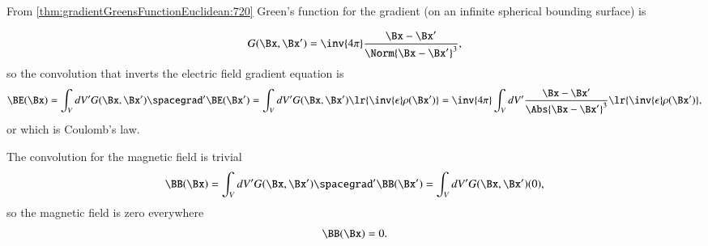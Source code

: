 %
%
From \cref{thm:gradientGreensFunctionEuclidean:720}
 Green's function for the gradient (on an infinite spherical bounding surface) is

\begin{dmath}\label{eqn:electrostatics_invertingGradient:260}
G(\Bx, \Bx') = \inv{4 \pi} \frac{\Bx - \Bx'}{\Norm{\Bx - \Bx'}^3},
\end{dmath}
so the convolution that inverts the electric field gradient equation is
\begin{dmath}\label{eqn:electrostatics_invertingGradient:621}
\BE(\Bx)
= \int_V dV' G(\Bx, \Bx') \spacegrad' \BE(\Bx')
= \int_V dV' G(\Bx, \Bx') \lr{ \inv{\epsilon}\rho(\Bx') }
= \inv{4\pi} \int_V dV' \frac{\Bx - \Bx'}{ \Abs{\Bx - \Bx'}^3 } \lr{ \inv{\epsilon}\rho(\Bx') },
\end{dmath}
or
which is Coulomb's law.

The convolution for the magnetic field is trivial
\begin{dmath}\label{eqn:electrostatics_invertingGradient:641}
\BB(\Bx)
= \int_V dV' G(\Bx, \Bx') \spacegrad' \BB(\Bx')
= \int_V dV' G(\Bx, \Bx') (0),
\end{dmath}
so the magnetic field is zero everywhere
\begin{dmath}\label{eqn:electrostatics_invertingGradient:320}
\BB(\Bx) = 0.
\end{dmath}


